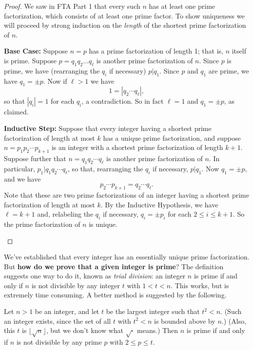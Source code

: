 \begin{proof}
We saw in FTA Part 1 that every such \(n\) has at least one prime factorization, which consists of at least one prime factor.
To show uniqueness we will proceed by strong induction on the \emph{length} of the shortest prime factorization of \(n\).
\begin{proplist}
\item \textbf{Base Case:} Suppose \(n = p\) has a prime factorization of length 1; that is, \(n\) itself is prime.
Suppose \(p = q_1q_2 \ldots q_\ell\) is another prime factorization of \(n\).
Since \(p\) is prime, we have (rearranging the \(q_i\) if necessary) \(p|q_1\).
Since \(p\) and \(q_1\) are prime, we have \(q_1 = \pm p\).
Now if \(\ell > 1\) we have \[ 1 = |q_2 \cdots q_\ell|, \] so that \(|q_i| = 1\) for each \(q_i\), a contradiction.
So in fact \(\ell = 1\) and \(q_1 = \pm p\), as claimed.
\item \textbf{Inductive Step:} Suppose that every integer having a shortest prime factorization of length at most \(k\) has a unique prime factorization, and suppose \(n = p_1p_2 \cdots p_{k+1}\) is an integer with a shortest prime factorization of length \(k+1\).
Suppose further that \(n = q_1q_2 \cdots q_\ell\) is another prime factorization of \(n\).
In particular, \(p_1 | q_1q_2 \cdots q_\ell\), so that, rearranging the \(q_i\) if necessary, \(p|q_1\).
Now \(q_1 = \pm p\), and we have \[p_2 \cdots p_{k+1} = q_2 \cdots q_\ell. \]
Note that these are two prime factorizations of an integer having a shortest prime factorization of length at most \(k\).
By the Inductive Hypothesis, we have \(\ell = k+1\) and, relabeling the \(q_i\) if necessary, \(q_i = \pm p_i\) for each \(2 \leq i \leq k+1\).
So the prime factorization of \(n\) is unique.
\qedhere
\end{proplist}
\end{proof}

We've established that every integer has an essentially unique prime factorization.
But \textbf{how do we prove that a given integer is prime}?
The definition suggests one way to do it, known as \emph{trial division}: an integer \(n\) is prime if and only if \(n\) is not divisible by any integer \(t\) with \(1 < t < n\).
This works, but is extremely time consuming.
A better method is suggested by the following.

\begin{prop}
Let \(n > 1\) be an integer, and let \(t\) be the largest integer such that \(t^2 < n\).
(Such an integer exists, since the set of all \(t\) with \(t^2 < n\) is bounded above by \(n\).)
(Also, this \(t\) is \(\lfloor \sqrt{n} \rfloor\), but we don't know what \(\sqrt{\cdot}\) means.)
Then \(n\) is prime if and only if \(n\) is not divisible by any prime \(p\) with \(2 \leq p \leq t\).
\end{prop}

